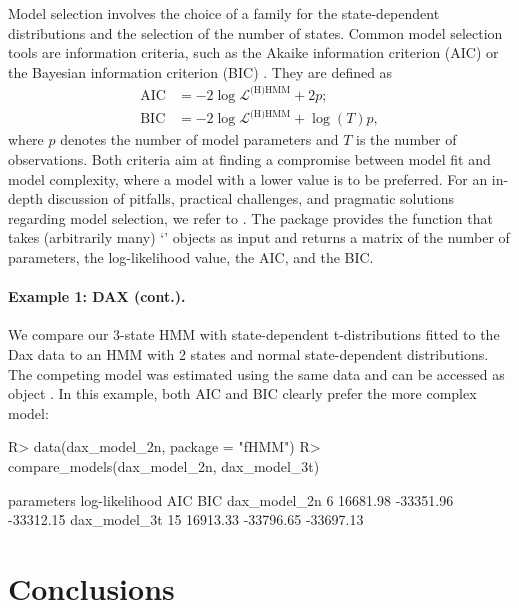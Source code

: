 \documentclass[article]{jss}
\newcommand{\class}[1]{`\code{#1}'}
\newcommand{\fct}[1]{\code{#1()}}
\begin{document}
Model selection involves the choice of a family for the state-dependent distributions and the selection of the number of states. Common model selection tools are information criteria, such as the Akaike information criterion (AIC) \citep{aka74} or the Bayesian information criterion (BIC) \citep{sch78}. They are defined as
\begin{align*}
\text{AIC} &= - 2 \log \mathcal{L}^\text{(H)HMM} + 2 p; \\
\text{BIC} &= - 2 \log \mathcal{L}^\text{(H)HMM} + \log(T) p,
\end{align*}
where $p$ denotes the number of model parameters and $T$ is the number of observations. Both criteria aim at finding a compromise between model fit and model complexity, where a model with a lower value is to be preferred. For an in-depth discussion of pitfalls, practical challenges, and pragmatic solutions regarding model selection, we refer to \cite{poh17}. The  package provides the \fct{compare\_models} function that takes (arbitrarily many) \class{fHMM\_model} objects as input and returns a matrix of the number of parameters, the log-likelihood value, the AIC, and the BIC. 

\paragraph{Example 1: DAX (cont.).} We compare our 3-state HMM with state-dependent t-distributions fitted to the Dax data to an HMM with 2 states and normal state-dependent distributions. The competing model was estimated using the same data and can be accessed as object . In this example, both AIC and BIC clearly prefer the more complex model:

%
\begin{Schunk}
\begin{Sinput}
R> data(dax_model_2n, package = "fHMM")
R> compare_models(dax_model_2n, dax_model_3t)
\end{Sinput}
\begin{Soutput}
             parameters log-likelihood       AIC       BIC
dax_model_2n          6       16681.98 -33351.96 -33312.15
dax_model_3t         15       16913.33 -33796.65 -33697.13
\end{Soutput}
\end{Schunk}
%


\section{Conclusions} \label{sec:conclusion} %
\end{document}
